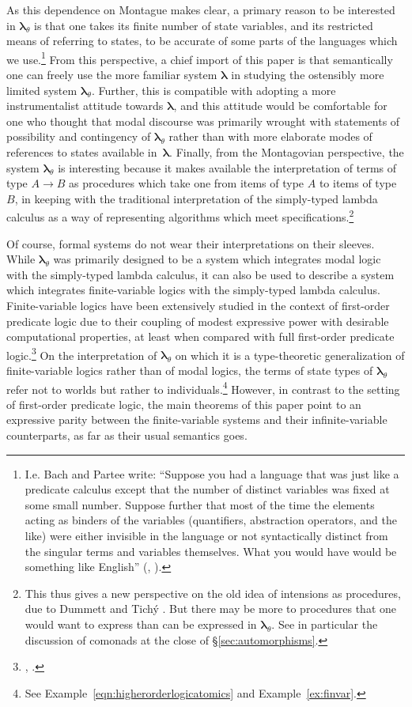 \documentclass{lmcs} %
\newcommand{\param}{\theta}
\newcommand{\mltup}{\boldsymbol\lambda_{\param}}
\newcommand{\lt}{\boldsymbol\lambda}
\begin{document}
As this dependence on Montague makes clear, a primary reason to be interested in $\mltup$ is that one takes its finite number of state variables, and its restricted means of referring to states, to be accurate of some parts of the languages which we use.\footnote{I.e. Bach and Partee write: ``Suppose you had a language that was just like a predicate calculus except that the number of distinct variables was fixed at some small number. Suppose further that most of the time the elements acting as binders of the variables (quantifiers, abstraction operators, and the like) were either invisible in the language or not syntactically distinct from the singular terms and variables themselves. What you would have would be something like English'' (\cite{Bach1980-tj}, \cite[122]{Bach2008-aq}).} From this perspective, a chief import of this paper is that semantically one can freely use the more familiar system $\lt$ in studying the ostensibly more limited system $\mltup$. Further, this is compatible with adopting a more instrumentalist attitude towards $\lt$, and this attitude would be comfortable for one who thought that modal discourse was primarily wrought with statements of possibility and contingency of $\mltup$ rather than with more elaborate modes of references to states available in~$\lt$. Finally, from the Montagovian perspective, the system $\mltup$ is interesting because it makes available the interpretation of terms of type $A\rightarrow B$ as procedures which take one from items of type $A$ to items of type $B$, in keeping with the traditional interpretation of the simply-typed lambda calculus as a way of representing algorithms which meet specifications.\footnote{This thus gives a new perspective on the old idea of intensions as procedures, due to Dummett \cite[93, cf. pp. 96, 102, 179~ff]{Dummett1981aa} and Tich\'y \cite{Tichy1969-kv}. But there may be more to procedures that one would want to express than can be expressed in $\mltup$. See in particular the discussion of comonads at the close of \S\ref{sec:automorphisms}.}

Of course, formal systems do not wear their interpretations on their sleeves. While $\mltup$ was primarily designed to be a system which integrates modal logic with the simply-typed lambda calculus, it can also be used to describe a system which integrates finite-variable logics with the simply-typed lambda calculus. Finite-variable logics have been extensively studied in the context of first-order predicate logic due to their coupling of modest expressive power with desirable computational properties, at least when compared with full first-order predicate logic.\footnote{\cite{Pratt-Hartmann2003-tx}, \cite{Pratt-Hartmann2023-mn}.} On the interpretation of $\mltup$ on which it is a type-theoretic generalization of finite-variable logics rather than of modal logics, the terms of state types of $\mltup$ refer not to worlds but rather to individuals.\footnote{See Example~\ref{eqn:higherorderlogicatomics} and Example~\ref{ex:finvar}.} However, in contrast to the setting of first-order predicate logic, the main theorems of this paper point to an expressive parity between the finite-variable systems and their infinite-variable counterparts, as far as their usual semantics goes.
\end{document}
